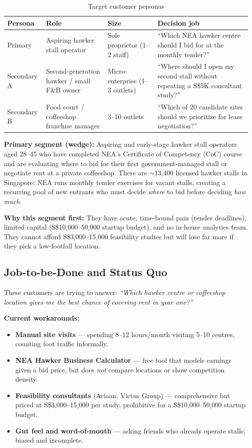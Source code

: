 \documentclass[11pt,a4paper]{article}
\begin{document}
\begin{table}[H]
\centering
\caption{Target customer personas}
\label{tab:personas}
\begin{tabular}{@{}p{2.8cm}p{2.5cm}p{2.2cm}p{5.8cm}@{}}
\toprule
\textbf{Persona} & \textbf{Role} & \textbf{Size} & \textbf{Decision job} \\
\midrule
Primary &
Aspiring hawker stall operator &
Sole proprietor (1--2 staff) &
``Which NEA hawker centre should I bid for at the monthly tender?'' \\
\addlinespace
Secondary A &
Second-generation hawker / small F\&B owner &
Micro-enterprise (1--3 outlets) &
``Where should I open my second stall without repeating a S\$5K consultant study?'' \\
\addlinespace
Secondary B &
Food court / coffeeshop franchise manager &
3--10 outlets &
``Which of 20 candidate sites should we prioritize for lease negotiation?'' \\
\bottomrule
\end{tabular}
\end{table}

\textbf{Primary segment (wedge):} Aspiring and early-stage hawker stall operators aged 28--45 who have completed NEA's Certificate of Competency (CoC) course and are evaluating where to bid for their first government-managed stall or negotiate rent at a private coffeeshop. There are $\sim$13,400 licensed hawker stalls in Singapore; NEA runs monthly tender exercises for vacant stalls, creating a recurring pool of new entrants who must decide \textit{where} to bid before deciding \textit{how much}.

\textbf{Why this segment first:} They have acute, time-bound pain (tender deadlines), limited capital (S\$10,000--50,000 startup budget), and no in-house analytics team. They cannot afford S\$3,000--15,000 feasibility studies but will lose far more if they pick a low-footfall location.

\subsection{Job-to-be-Done and Status Quo}

These customers are trying to answer: \textit{``Which hawker centre or coffeeshop location gives me the best chance of covering rent in year one?''}

\textbf{Current workarounds:}
\begin{itemize}
  \item \textbf{Manual site visits} --- spending 8--12 hours/month visiting 5--10 centres, counting foot traffic informally.
  \item \textbf{NEA Hawker Business Calculator} --- free tool that models earnings given a bid price, but does \textit{not} compare locations or show competition density.
  \item \textbf{Feasibility consultants} (Aviaan, Victus Group) --- comprehensive but priced at S\$3,000--15,000 per study, prohibitive for a S\$10,000--50,000 startup budget.
  \item \textbf{Gut feel and word-of-mouth} --- asking friends who already operate stalls; biased and incomplete.
\end{itemize}
\end{document}

